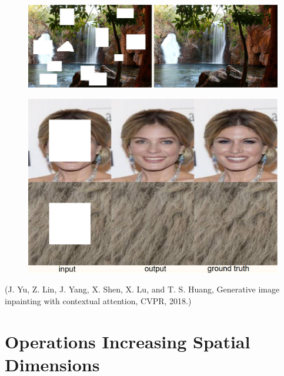 \begin{example}
    \begin{figure}[H]
        \centering
        \includegraphics[width=1.0\textwidth]{.././assets/8.11.png}
    \end{figure}

    \begin{figure}[H]
        \centering
        \includegraphics[width=1.0\textwidth]{.././assets/8.12.png}
    \end{figure}

    (J. Yu, Z. Lin, J. Yang, X. Shen, X. Lu, and T. S. Huang, Generative image inpainting with contextual attention, CVPR, 2018.)
\end{example}

\section{Operations Increasing Spatial Dimensions}

